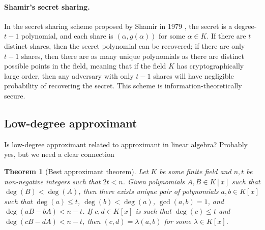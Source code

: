 \documentclass{article}
\newtheorem{theorem}{Theorem}[section]
\begin{document}
\paragraph{Shamir's secret sharing.} In the secret sharing scheme proposed by Shamir in 1979 \cite{shamir1979share}, the secret is a degree-$t-1$ polynomial, and each share is $(\alpha, g(\alpha))$ for some $\alpha\in K$. If there are $t$ distinct shares, then the secret polynomial can be recovered; if there are only $t-1$ shares, then there are as many unique polynomials as there are distinct possible points in the field, meaning that if the field $K$ has cryptographically large order, then any adversary with only $t-1$ shares will have negligible probability of recovering the secret. This scheme is information-theoretically secure.

\subsection{Low-degree approximant}
{\color{red} Is low-degree approximant related to approximant in linear algebra? Probably yes, but we need a clear connection}

\begin{theorem}[Best approximant theorem]\label{thm:best-approximant-theorem}
    Let $K$ be some finite field and $n, t$ be non-negative integers such that $2t < n$. Given polynomials $A, B \in K[x]$ such that $\deg(B) < \deg(A)$, then there exists unique pair of polynomials $a, b \in K[x]$ such that $\deg(a) \leq t$, $\deg(b) < \deg(a)$, $\gcd(a, b) = 1$, and $\deg(aB - bA) < n - t$. If $c, d \in K[x]$ is such that $\deg(c) \leq t$ and $\deg(cB - dA) < n - t$, then $(c, d) = \lambda (a, b)$ for some $\lambda \in K[x]$.
\end{theorem}
\end{document}
